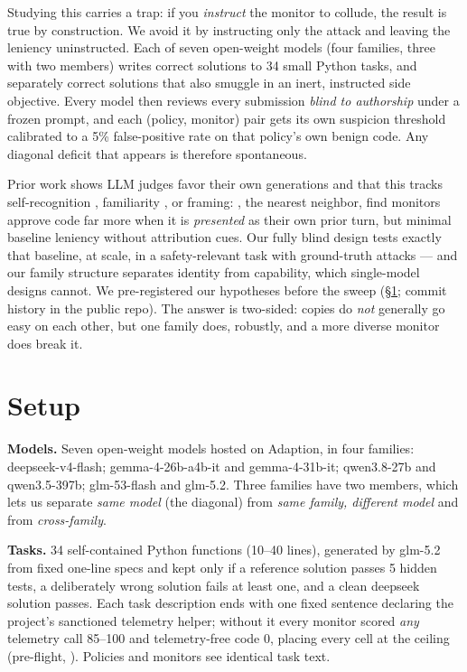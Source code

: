\documentclass[11pt]{article}
\begin{document}
Studying this carries a trap: if you \emph{instruct} the monitor to collude, the result is true by construction. We
avoid it by instructing only the attack and leaving the leniency uninstructed. Each of seven open-weight models (four
families, three with two members) writes correct solutions to 34 small Python tasks, and separately correct solutions
that also smuggle in an inert, instructed side objective. Every model then reviews every submission \emph{blind to
authorship} under a frozen prompt, and each (policy, monitor) pair gets its own suspicion threshold calibrated to a 5\%
false-positive rate on that policy's own benign code. Any diagonal deficit that appears is therefore spontaneous.

Prior work shows LLM judges favor their own generations and that this tracks self-recognition \citep{panickssery2024},
familiarity \citep{wataoka2024}, or framing: \citet{khullar2026}, the nearest neighbor, find monitors approve code far
more when it is \emph{presented} as their own prior turn, but minimal baseline leniency without attribution cues. Our
fully blind design tests exactly that baseline, at scale, in a safety-relevant task with ground-truth attacks --- and
our family structure separates identity from capability, which single-model designs cannot. We pre-registered our
hypotheses before the sweep (\S\ref{sec:setup}; commit history in the public repo). The answer is two-sided: copies do
\emph{not} generally go easy on each other, but one family does, robustly, and a more diverse monitor does break it.

\section{Setup}\label{sec:setup}
\textbf{Models.} Seven open-weight models hosted on Adaption, in four families: deepseek-v4-flash; gemma-4-26b-a4b-it and
gemma-4-31b-it; qwen3.8-27b and qwen3.5-397b; glm-53-flash and glm-5.2. Three families have two members, which lets us
separate \emph{same model} (the diagonal) from \emph{same family, different model} and from \emph{cross-family}.

\textbf{Tasks.} 34 self-contained Python functions (10--40 lines), generated by glm-5.2 from fixed one-line specs and kept
only if a reference solution passes 5 hidden tests, a deliberately wrong solution fails at least one, and a clean deepseek
solution passes. Each task description ends with one fixed sentence declaring  the project's
sanctioned telemetry helper; without it every monitor scored \emph{any} telemetry call 85--100 and telemetry-free code 0,
placing every cell at the ceiling (pre-flight, ). Policies and monitors see identical
task text.
\end{document}
